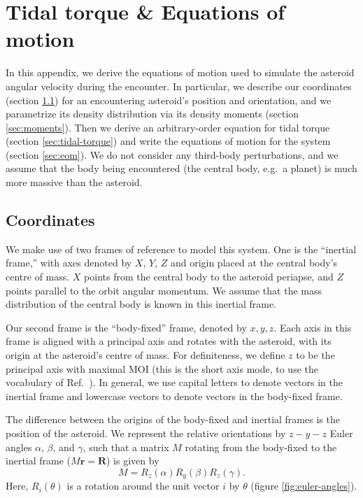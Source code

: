 


\appendix

\section{Tidal torque \& Equations of motion}
\label{app:eom}

In this appendix, we derive the equations of motion used to simulate the asteroid angular velocity during the encounter. In particular, we describe our coordinates (section \ref{sec:coordinates}) for an encountering asteroid's position and orientation, and we parametrize its density distribution via its density moments (section \ref{sec:moments}). Then we derive an arbitrary-order equation for tidal torque (section \ref{sec:tidal-torque}) and write the equations of motion for the system (section \ref{sec:eom}). We do not consider any third-body perturbations, and we assume that the body being encountered (the central body, e.g.~a planet) is much more massive than the asteroid.

\subsection{Coordinates}
\label{sec:coordinates}

We make use of two frames of reference to model this system. One is the ``inertial frame,'' with axes denoted by $\unit{X}$, $\unit{Y}$, $\unit{Z}$ and origin placed at the central body's centre of mass. $\unit{X}$ points from the central body to the asteroid periapse, and $\unit{Z}$ points parallel to the orbit angular momentum. We assume that the mass distribution of the central body is known in this inertial frame.

Our second frame is the ``body-fixed'' frame, denoted by $\unit{x}, \unit{y}, \unit{z}$. Each axis in this frame is aligned with a principal axis and rotates with the asteroid, with its origin at the asteroid's centre of mass. For definiteness, we define $\unit{z}$ to be the principal axis with maximal MOI (this is the short axis mode, to use the vocabulary of Ref.~\cite{kaasalainen2001interpretation}). In general, we use capital letters to denote vectors in the inertial frame and lowercase vectors to denote vectors in the body-fixed frame.

The difference between the origins of the body-fixed and inertial frames is the position of the asteroid. We represent the relative orientations by $z-y-z$ Euler angles $\alpha$, $\beta$, and $\gamma$, such that a matrix $M$ rotating from the body-fixed to the inertial frame ($M\bm{r} = \bm{R}$) is given by
\begin{equation}
M = R_z(\alpha) R_y(\beta) R_z(\gamma).
\label{eqn:euler-angles}
\end{equation}
Here, $R_i(\theta)$ is a rotation around the unit vector $i$ by $\theta$ (figure \ref{fig:euler-angles}).

